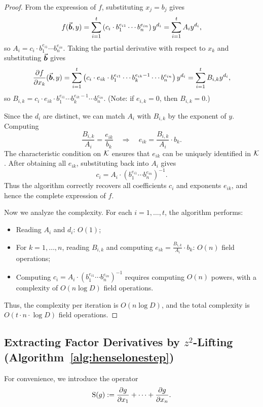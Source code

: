 \documentclass{article}
\numberwithin{equation}{section}
\begin{document}
\begin{proof}
From the expression of $f$, substituting $x_j = b_j$ gives
\[
f(\vec{\boldsymbol{b}}, y) = \sum_{i=1}^{t} \left( c_i \cdot b_1^{e_{i1}} \cdots b_n^{e_{in}} \right) y^{d_i} = \sum_{i=1}^{t} A_i y^{d_i},
\]
so $A_i = c_i \cdot b_1^{e_{i1}} \cdots b_n^{e_{in}}$.
%
Taking the partial derivative with respect to $x_k$ and substituting $\vec{\boldsymbol{b}}$ gives
\[
\frac{\partial f}{\partial x_k}(\vec{\boldsymbol{b}}, y) = \sum_{i=1}^{t} \left( c_i \cdot e_{ik} \cdot b_1^{e_{i1}} \cdots b_k^{e_{ik}-1} \cdots b_n^{e_{in}} \right) y^{d_i} = \sum_{i=1}^{t} B_{i,k} y^{d_i},
\]
so $B_{i,k} = c_i \cdot e_{ik} \cdot b_1^{e_{i1}} \cdots b_k^{e_{ik}-1} \cdots b_n^{e_{in}}$. (Note: if $e_{i,k}=0$, then $B_{i,k}=0$.)

Since the $d_i$ are distinct, we can match $A_i$ with $B_{i,k}$ by the exponent of $y$. Computing
\[
\frac{B_{i,k}}{A_i} = \frac{e_{ik}}{b_k} \quad \Rightarrow \quad e_{ik} = \frac{B_{i,k}}{A_i} \cdot b_k.
\]
The characteristic condition on ${\mathcal{K}}$ ensures that $e_{ik}$ can be uniquely identified in ${\mathcal{K}}$. After obtaining all $e_{ik}$, substituting back into $A_i$ gives
\[
c_i = A_i \cdot \left( b_1^{e_{i1}} \cdots b_n^{e_{in}} \right)^{-1}.
\]
Thus the algorithm correctly recovers all coefficients $c_i$ and exponents $e_{ik}$, and hence the complete expression of $f$.

Now we analyze the complexity.
For each $i = 1, \dots, t$, the algorithm performs:
\begin{itemize}
    \item Reading $A_i$ and $d_i$: $O(1)$;
    \item For $k = 1, \dots, n$, reading $B_{i,k}$ and computing $e_{ik} = \frac{B_{i,k}}{A_i} \cdot b_k$: $O(n)$ field operations;
    \item Computing $c_i = A_i \cdot (b_1^{e_{i1}} \cdots b_n^{e_{in}})^{-1}$ requires computing $O(n)$ powers, with a complexity of $O(n \log D)$ field operations.
\end{itemize}
Thus, the complexity per iteration is $O(n\log D)$, and the total complexity is $O(t \cdot n \cdot \log D)$ field operations.
\end{proof}

\subsection{Extracting Factor Derivatives by $z^2$-Lifting (Algorithm~\ref{alg:henselonestep})}
\label{sec:z2-lifting}


For convenience, we introduce the operator
\[
{\rm S}(g) := \frac{\partial g}{\partial x_1} + \cdots + \frac{\partial g}{\partial x_n}.
\]
\end{document}
